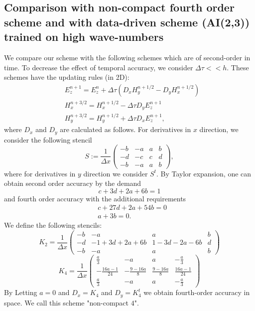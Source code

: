 \documentclass[12pt,reqno]{amsart}
\theoremstyle{definition}
\numberwithin{equation}{section}
\begin{document}
		\subsection{Comparison with non-compact fourth order scheme and with data-driven scheme (AI(2,3)) trained on high wave-numbers}
		We compare our scheme with the following schemes which are of second-order in time. To decrease the effect of temporal accuracy, we consider $\Delta \tau << h$.
		These schemes have the updating rules (in 2D):
		\begin{align*}
			&
E_z^{n+1}=E_z^n+\Delta \tau (D_x H_y^{n+1/2}-D_yH_x^{n+1/2})\\ &
H_x^{n+3/2}=H_x^{n+1/2}-\Delta \tau D_y E_z^{n+1} \\&
H_y^{n+3/2}=H_y^{n+1/2}+\Delta \tau D_x E_z^{n+1},
    \end{align*}
where $D_x$ and $D_y$ are calculated as follows.
       For derivatives in $x$ direction,  we consider the following stencil 
        				$$
        				S:=
        \frac{1}{\Delta x}
        \begin{pmatrix}
        	-b & -a & a & b \\
        	-d & -c& c &d \\
        	-b & -a & a & b
        \end{pmatrix},
        $$
        where for derivatives in $y$ direction we consider $S^t$.
        By Taylor expansion, one can obtain second order accuracy by the demand
        $$c+3d+2a+6b=1$$
        and fourth order accuracy with the additional requirements 
        \begin{align}
        	& c+27d+2a+54b=0 \\&
        	a+3b=0.
        \end{align}
We define the following stencils:
    $$
    K_2=
    \frac{1}{\Delta x}
    \begin{pmatrix}
    	-b & -a & a & b \\
    	-d & -1+3d+2a+6b& 1-3d-2a-6b &d \\
    	-b & -a & a & b
    \end{pmatrix}
    $$
    $$
    K_4=
    \frac{1}{\Delta x}
    \begin{pmatrix}
    	\frac{a}{3} &-a&a&-\frac{a}{3}  \\
    	-\frac{16a-1}{24}& - \frac{9-16a}{8}& \frac{9-16a}{8} &\frac{16a-1}{24} \\
    	\frac{a}{3}  & - a& a & -\frac{a}{3} 
    \end{pmatrix}
    $$
    By Letting $a=0$ and  $D_x=K_4$ and $D_y=K_4^t$ we obtain fourth-order accuracy in space. We call this scheme "non-compact $4$".
    
\end{document}
